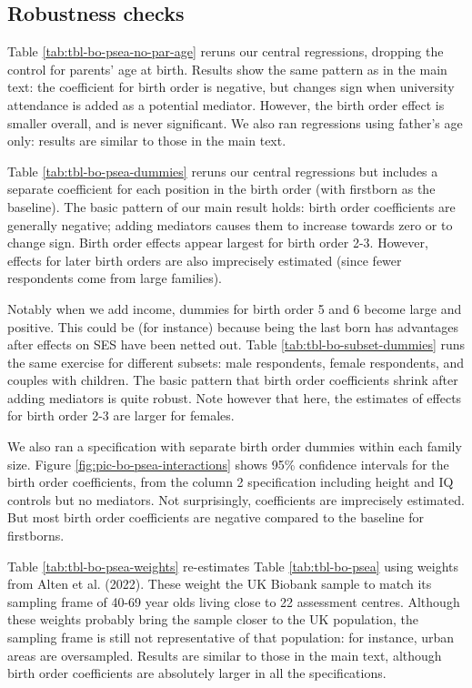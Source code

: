 \documentclass[
]{article}
\theoremstyle{definition}
\theoremstyle{definition}
\theoremstyle{definition}
\theoremstyle{definition}
\theoremstyle{remark}
\begin{document}
\FloatBarrier

\newpage

\hypertarget{robustness-checks}{%
\subsection{Robustness checks}\label{robustness-checks}}

Table \ref{tab:tbl-bo-psea-no-par-age} reruns our central regressions,
dropping the control for parents' age at birth. Results show the same
pattern as in the main text: the coefficient for birth order is
negative, but changes sign when university attendance is added as a
potential mediator. However, the birth order effect is smaller overall,
and is never significant. We also ran regressions using father's age
only: results are similar to those in the main text.

Table \ref{tab:tbl-bo-psea-dummies} reruns our central regressions but
includes a separate coefficient for each position in the birth order
(with firstborn as the baseline). The basic pattern of our main result
holds: birth order coefficients are generally negative; adding mediators
causes them to increase towards zero or to change sign. Birth order
effects appear largest for birth order 2-3. However, effects for later
birth orders are also imprecisely estimated (since fewer respondents
come from large families).

Notably when we add income, dummies for birth order 5 and 6 become large
and positive. This could be (for instance) because being the last born
has advantages after effects on SES have been netted out. Table
\ref{tab:tbl-bo-subset-dummies} runs the same exercise for different
subsets: male respondents, female respondents, and couples with
children. The basic pattern that birth order coefficients shrink after
adding mediators is quite robust. Note however that here, the estimates
of effects for birth order 2-3 are larger for females.

We also ran a specification with separate birth order dummies within
each family size. Figure \ref{fig:pic-bo-psea-interactions} shows 95\%
confidence intervals for the birth order coefficients, from the column 2
specification including height and IQ controls but no mediators. Not
surprisingly, coefficients are imprecisely estimated. But most birth
order coefficients are negative compared to the baseline for firstborns.

Table \ref{tab:tbl-bo-psea-weights} re-estimates Table \ref{tab:tbl-bo-psea}
using weights from Alten et al. (2022). These weight the UK Biobank sample
to match its sampling frame of 40-69 year olds living close to 22 assessment
centres. Although these weights probably bring the sample closer to the UK population, the sampling frame is still not representative of that population:
for instance, urban areas are oversampled. Results are similar to those in
the main text, although birth order coefficients are absolutely larger in all
the specifications.
\end{document}
